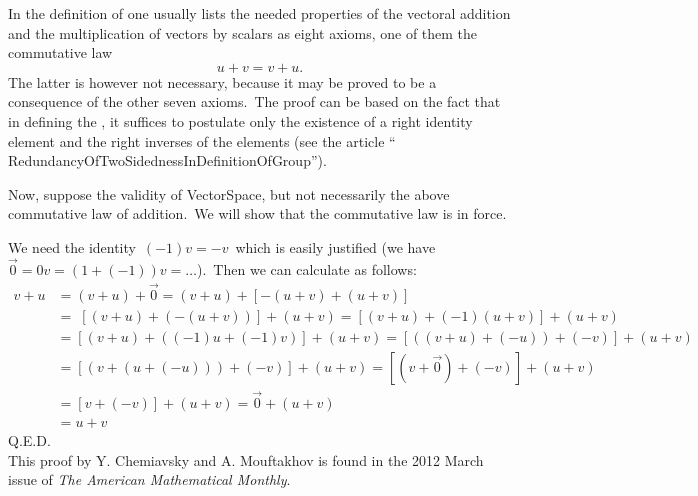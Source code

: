 \documentclass[12pt]{article}
\begin{document}
In the definition of  one 
usually lists the needed properties of the vectoral addition 
and the multiplication of vectors by scalars as eight axioms, 
one of them the commutative law
$$u+v = v+u.$$
The latter is however not necessary, because it may be proved 
to be a consequence of the other seven axioms.\, The proof can 
be based on the fact that in defining the , 
it suffices to postulate only the existence of a right identity 
element and the right inverses of the elements (see the article 
``
{RedundancyOfTwoSidednessInDefinitionOfGroup}''). 

Now, suppose the validity of 
{VectorSpace}, but not necessarily the above commutative law of 
addition.\, We will show that the commutative law is in force.

We need the identity\, $(-1)v = -v$\, which is easily justified
(we have $\vec{0} = 0v = (1+(-1))v = \ldots$).\, Then we can 
calculate as follows:
\begin{align*}
v+u &= (v+u)+\vec{0} = (v+u)+[-(u+v)+(u+v)]\\
      &=\; [(v+u)+(-(u+v))]+(u+v) = [(v+u)+(-1)(u+v)]+(u+v)\\
      &= [(v+u)+((-1)u+(-1)v)]+(u+v) = [((v+u)+(-u))+(-v)]+(u+v)\\
      &= [(v+(u+(-u)))+(-v)]+(u+v) = [(v+\vec{0})+(-v)]+(u+v)\\
      &= [v+(-v)]+(u+v) = \vec{0}+(u+v) \\
      &=u+v
\end{align*}
Q.E.D.\\

This proof by {\sc Y. Chemiavsky} and {\sc A. Mouftakhov} is 
found in the 2012 March issue of {\it The American Mathematical 
Monthly}.\\
\end{document}
